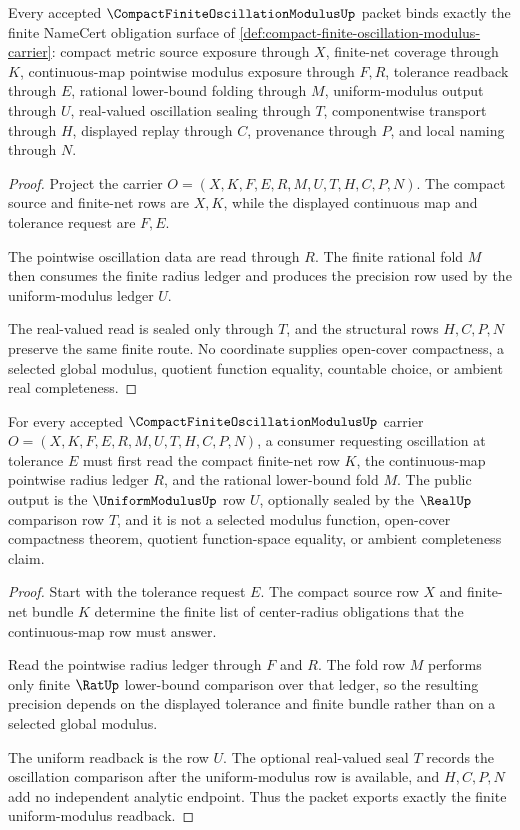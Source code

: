 \begin{theorem}
\label{thm:compact-finite-oscillation-modulus-namecert-obligations}
Every accepted $\CompactFiniteOscillationModulusUp$ packet binds exactly the finite NameCert obligation surface of \autoref{def:compact-finite-oscillation-modulus-carrier}: compact metric source exposure through $X$, finite-net coverage through $K$, continuous-map pointwise modulus exposure through $F,R$, tolerance readback through $E$, rational lower-bound folding through $M$, uniform-modulus output through $U$, real-valued oscillation sealing through $T$, componentwise transport through $H$, displayed replay through $C$, provenance through $P$, and local naming through $N$.
\end{theorem}
\begin{proof}
Project the carrier $O=(X,K,F,E,R,M,U,T,H,C,P,N)$. The compact source and finite-net rows are $X,K$, while the displayed continuous map and tolerance request are $F,E$.

The pointwise oscillation data are read through $R$. The finite rational fold $M$ then consumes the finite radius ledger and produces the precision row used by the uniform-modulus ledger $U$.

The real-valued read is sealed only through $T$, and the structural rows $H,C,P,N$ preserve the same finite route. No coordinate supplies open-cover compactness, a selected global modulus, quotient function equality, countable choice, or ambient real completeness.
\end{proof}

\begin{theorem}
\label{thm:compact-finite-oscillation-modulus-uniform-readback}
For every accepted $\CompactFiniteOscillationModulusUp$ carrier $O=(X,K,F,E,R,M,U,T,H,C,P,N)$, a consumer requesting oscillation at tolerance $E$ must first read the compact finite-net row $K$, the continuous-map pointwise radius ledger $R$, and the rational lower-bound fold $M$. The public output is the $\UniformModulusUp$ row $U$, optionally sealed by the $\RealUp$ comparison row $T$, and it is not a selected modulus function, open-cover compactness theorem, quotient function-space equality, or ambient completeness claim.
\end{theorem}
\begin{proof}
Start with the tolerance request $E$. The compact source row $X$ and finite-net bundle $K$ determine the finite list of center-radius obligations that the continuous-map row must answer.

Read the pointwise radius ledger through $F$ and $R$. The fold row $M$ performs only finite $\RatUp$ lower-bound comparison over that ledger, so the resulting precision depends on the displayed tolerance and finite bundle rather than on a selected global modulus.

The uniform readback is the row $U$. The optional real-valued seal $T$ records the oscillation comparison after the uniform-modulus row is available, and $H,C,P,N$ add no independent analytic endpoint. Thus the packet exports exactly the finite uniform-modulus readback.
\end{proof}

